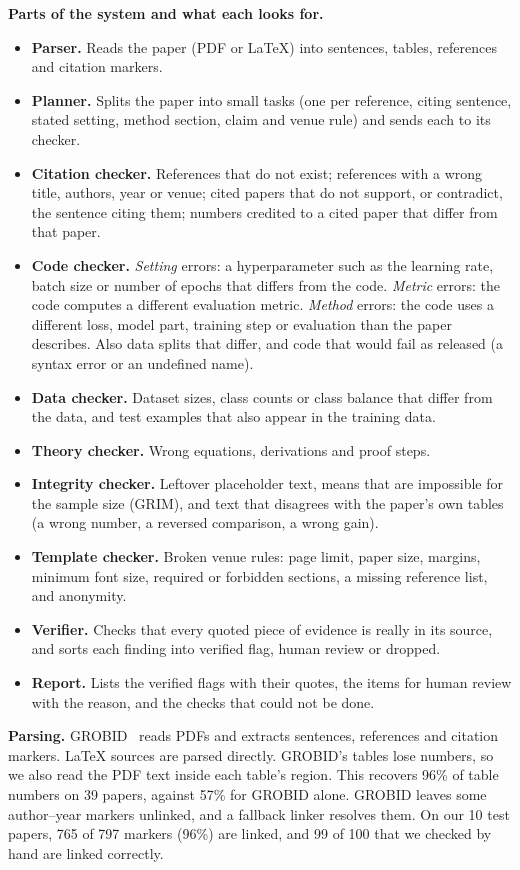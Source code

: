 \documentclass[11pt,a4paper]{article}
\begin{document}
\textbf{Parts of the system and what each looks for.}
\begin{itemize}
\item \textbf{Parser.} Reads the paper (PDF or LaTeX) into sentences, tables, references and
citation markers.
\item \textbf{Planner.} Splits the paper into small tasks (one per reference, citing sentence,
stated setting, method section, claim and venue rule) and sends each to its checker.
\item \textbf{Citation checker.} References that do not exist; references with a wrong title,
authors, year or venue; cited papers that do not support, or contradict, the sentence citing them;
numbers credited to a cited paper that differ from that paper.
\item \textbf{Code checker.} \emph{Setting} errors: a hyperparameter such as the learning rate,
batch size or number of epochs that differs from the code. \emph{Metric} errors: the code computes
a different evaluation metric. \emph{Method} errors: the code uses a different loss, model part,
training step or evaluation than the paper describes. Also data splits that differ, and code that
would fail as released (a syntax error or an undefined name).
\item \textbf{Data checker.} Dataset sizes, class counts or class balance that differ from the data,
and test examples that also appear in the training data.
\item \textbf{Theory checker.} Wrong equations, derivations and proof steps.
\item \textbf{Integrity checker.} Leftover placeholder text, means that are impossible for the sample
size (GRIM), and text that disagrees with the paper's own tables (a wrong number, a reversed
comparison, a wrong gain).
\item \textbf{Template checker.} Broken venue rules: page limit, paper size, margins, minimum font
size, required or forbidden sections, a missing reference list, and anonymity.
\item \textbf{Verifier.} Checks that every quoted piece of evidence is really in its source, and
sorts each finding into verified flag, human review or dropped.
\item \textbf{Report.} Lists the verified flags with their quotes, the items for human review with
the reason, and the checks that could not be done.
\end{itemize}

\textbf{Parsing.} GROBID~\cite{grobid} reads PDFs and extracts sentences, references and citation
markers. LaTeX sources are parsed directly. GROBID's tables lose numbers, so we also read the PDF
text inside each table's region. This recovers 96\% of table numbers on 39 papers, against 57\%
for GROBID alone. GROBID leaves some author--year markers unlinked, and a fallback linker resolves
them. On our 10 test papers, 765 of 797 markers (96\%) are linked, and 99 of 100 that we checked
by hand are linked correctly.
\end{document}
